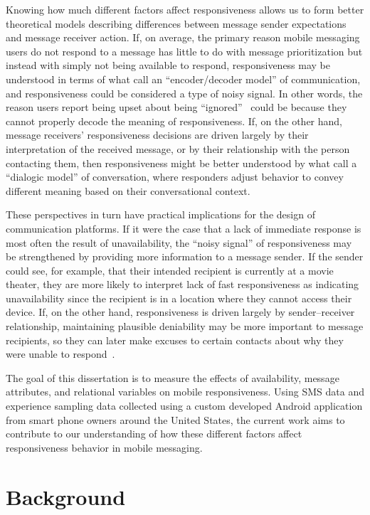 \documentclass[12pt]{nuthesis}	%
\begin{document}
Knowing how much different factors affect responsiveness allows us to form better theoretical models describing differences between message sender expectations and message receiver action. If, on average, the primary reason mobile messaging users do not respond to a message has little to do with message prioritization but instead with simply not being available to respond, responsiveness may be understood in terms of what \citet{krauss1996social} call an ``encoder/decoder model'' of communication, and responsiveness could be considered a type of noisy signal. In other words, the reason users report being upset about being ``ignored''~\citep{church2013s} could be because they cannot properly decode the meaning of responsiveness. If, on the other hand, message receivers' responsiveness decisions are driven largely by their interpretation of the received message, or by their relationship with the person contacting them, then responsiveness might be better understood by what \citet{krauss1996social} call a ``dialogic model'' of conversation, where responders adjust behavior to convey different meaning based on their conversational context.

These perspectives in turn have practical implications for the design of communication platforms. If it were the case that a lack of immediate response is most often the result of unavailability, the ``noisy signal'' of responsiveness may be strengthened by providing more information to a message sender. If the sender could see, for example, that their intended recipient is currently at a movie theater, they are more likely to interpret lack of fast responsiveness as indicating unavailability since the recipient is in a location where they cannot access their device. If, on the other hand, responsiveness is driven largely by sender--receiver relationship, maintaining plausible deniability may be more important to message recipients, so they can later make excuses to certain contacts about why they were unable to respond~\citep[as in][]{aoki2005making, hancock2009butler}.

The goal of this dissertation is to measure the effects of availability, message attributes, and relational variables on mobile responsiveness. Using SMS data and experience sampling data collected using a custom developed Android application from smart phone owners around the United States, the current work aims to contribute to our understanding of how these different factors affect responsiveness behavior in mobile messaging.

\chapter{Background}
\end{document}
